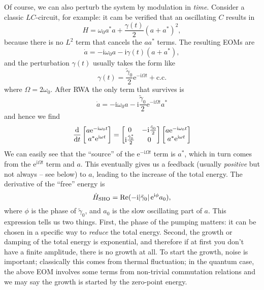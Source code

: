 \documentclass[hyperref, a4paper]{article}
\newcommand*{\ii}{\mathrm{i}}
\newcommand*{\ee}{\mathrm{e}}
\begin{document}
Of course, we can also perturb the system by modulation in \emph{time}.
Consider a classic $LC$-circuit, for example:
it cam be verified that an oscillating \(C\) results in 
\begin{equation}
    H = \omega_0 a^* a + \frac{\gamma(t)}{2} (a + a^*)^2,
\end{equation}
because there is no \(L^2\) term that cancels the \(a a^*\) terms.
The resulting EOMs are 
\begin{equation}
    \dot{a} = - \ii \omega_0 a - \ii \gamma(t) (a + a^*), 
\end{equation}
and the perturbation $\gamma(t)$ usually takes the form like 
\begin{equation}
    \gamma(t) = \frac{\tilde{\gamma}_0}{2} \ee^{- \ii \Omega t} + \text{c.c.}
\end{equation}
where $\Omega = 2 \omega_0$.
After RWA the only term that survives is 
\begin{equation}
    \dot{a} = - \ii \omega_0 a - \ii \frac{\tilde{\gamma}_0}{2} \ee^{- \ii \Omega t} a^*
\end{equation}
and hence we find 
\begin{equation}
    \dv{t} \bmqty{a \ee^{- \ii \omega_0 t} \\ a^* \ee^{\ii \omega t}} = \bmqty{
        0 & - \ii \frac{\tilde{\gamma}_0}{2} \\
        \ii \frac{\tilde{\gamma}_0^*}{2} & 0 
    } \bmqty{a \ee^{- \ii \omega_0 t} \\ a^* \ee^{\ii \omega t}}
\end{equation}
We can easily see that the ``source'' of the $\ee^{- \ii \Omega t}$ term is $a^*$, 
which in turn comes from the $\ee^{\ii \Omega t}$ term and $a$.
This eventually gives us a feedback (usually \emph{positive} but not always -- see below) to $a$,
leading to the increase of the total energy.
The derivative of the ``free'' energy is 
\begin{equation}
    \dot{H}_{\text{SHO}} = \Re (- \ii \abs*{\tilde{\gamma}_0} \ee^{\ii \phi} a_0), 
\end{equation}
where $\phi$ is the phase of $\tilde{\gamma}_0$, 
and $a_0$ is the slow oscillating part of $a$.
This expression tells us two things.
First, the phase of the pumping matters: 
it can be chosen in a specific way to \emph{reduce} the total energy.
Second, the growth or damping of the total energy is exponential, 
and therefore if at first you don't have a finite amplitude, 
there is no growth at all.
To start the growth, noise is important; 
classically this comes from thermal fluctuation; 
in the quantum case, the above EOM involves some terms from non-trivial commutation relations 
and we may say the growth is started by the zero-point energy.
\end{document}
